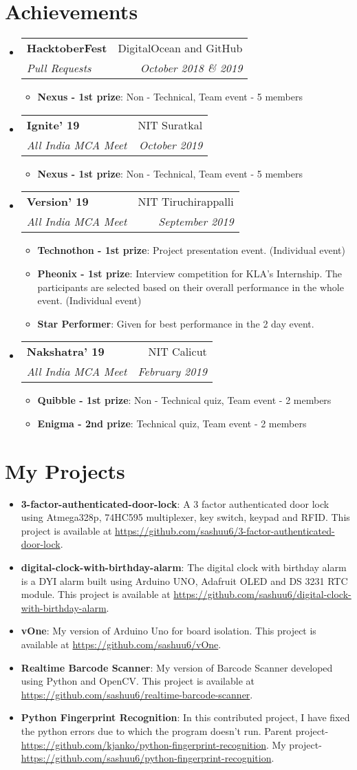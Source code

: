\documentclass[letterpaper,11pt]{article}
\makeatletter
\newcommand{\resumeItem}[2]{
	\item\small{
    		\textbf{#1}{: #2 \vspace{-2pt}}
  	}
}
\newcommand{\resumeSubheading}[4]{
  	\vspace{-1pt}\item
    	\begin{tabular*}{0.97\textwidth}[t]{l@{\extracolsep{\fill}}r}
      		\textbf{#1} & #2 \\
      		\textit{\small#3} & \textit{\small #4} \\
    	\end{tabular*}\vspace{-5pt}
}
\newcommand{\resumeSubItem}[2]{\resumeItem{#1}{#2}\vspace{-4pt}}
\newcommand{\resumeSubHeadingListStart}{\begin{itemize}[leftmargin=*]}
\newcommand{\resumeSubHeadingListEnd}{\end{itemize}}
\newcommand{\resumeItemListStart}{\begin{itemize}}
\newcommand{\resumeItemListEnd}{\end{itemize}\vspace{-5pt}}
\makeatother
\begin{document}
\section{Achievements}
  	\resumeSubHeadingListStart
		\resumeSubheading
      			{HacktoberFest}{DigitalOcean and GitHub}
      			{Pull Requests}{October 2018 \& 2019}
			\resumeItemListStart
      				\resumeItem{Nexus - 1st prize}
          				{Non - Technical, Team event - 5 members}
       			\resumeItemListEnd
		\resumeSubheading
      			{Ignite' 19}{NIT Suratkal}
      			{All India MCA Meet}{October 2019}
			\resumeItemListStart
      				\resumeItem{Nexus - 1st prize}
          				{Non - Technical, Team event - 5 members}
       			\resumeItemListEnd
		\resumeSubheading
      			{Version' 19}{NIT Tiruchirappalli}
      			{All India MCA Meet}{September 2019}
			\resumeItemListStart
      				\resumeItem{Technothon - 1st prize}
          				{Project presentation event. (Individual event)}
				\resumeItem{Pheonix - 1st prize}
          				{Interview competition for KLA's Internship. The participants are selected based on their overall performance in the whole event. (Individual event)}
				\resumeItem{Star Performer}
          				{Given for best performance in the 2 day event.}
       			\resumeItemListEnd
   		\resumeSubheading
      			{Nakshatra' 19}{NIT Calicut}
      			{All India MCA Meet}{February 2019}
			\resumeItemListStart
      				\resumeItem{Quibble - 1st prize}
          				{Non - Technical quiz, Team event - 2 members}
				\resumeItem{Enigma - 2nd prize}
          				{Technical quiz, Team event - 2 members}
       			\resumeItemListEnd
  	\resumeSubHeadingListEnd

\section{My Projects}
  	\resumeSubHeadingListStart
    		\resumeSubItem{3-factor-authenticated-door-lock}
      			{ A 3 factor authenticated door lock using Atmega328p, 74HC595 multiplexer, key switch, keypad and RFID. This project is available at \url{https://github.com/sashuu6/3-factor-authenticated-door-lock}.}
    		\resumeSubItem{digital-clock-with-birthday-alarm}
      			{The digital clock with birthday alarm is a DYI alarm built using Arduino UNO, Adafruit OLED and DS 3231 RTC module. This project is available at \url{https://github.com/sashuu6/digital-clock-with-birthday-alarm}.}
      		\resumeSubItem{vOne}
      			{My version of Arduino Uno for board isolation. This project is available at \url{https://github.com/sashuu6/vOne}.}
       		\resumeSubItem{Realtime Barcode Scanner}
      			{My version of Barcode Scanner developed using Python and OpenCV. This project is available at \url{https://github.com/sashuu6/realtime-barcode-scanner}.}
		\resumeSubItem{Python Fingerprint Recognition}
			{In this contributed project, I have fixed the python errors due to which the program doesn't run. Parent project-\url{https://github.com/kjanko/python-fingerprint-recognition}. My project-\url{https://github.com/sashuu6/python-fingerprint-recognition}.}
  	\resumeSubHeadingListEnd
\end{document}
